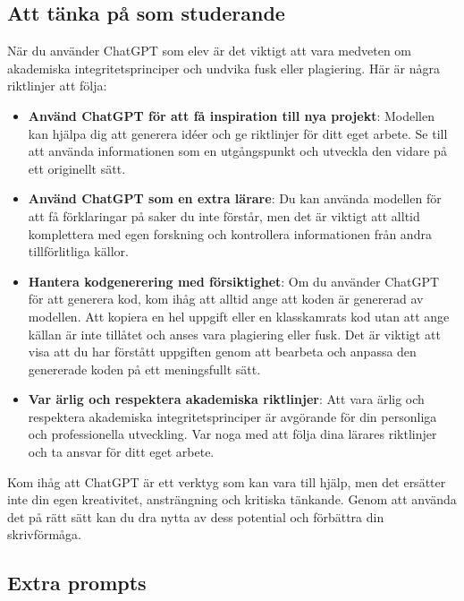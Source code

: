 \hypertarget{att-tuxe4nka-puxe5-som-studerande}{%
\subsection{Att tänka på som
studerande}\label{att-tuxe4nka-puxe5-som-studerande}}

När du använder ChatGPT som elev är det viktigt att vara medveten om
akademiska integritetsprinciper och undvika fusk eller plagiering. Här
är några riktlinjer att följa:

\begin{itemize}
\item
  \textbf{Använd ChatGPT för att få inspiration till nya projekt}:
  Modellen kan hjälpa dig att generera idéer och ge riktlinjer för ditt
  eget arbete. Se till att använda informationen som en utgångspunkt och
  utveckla den vidare på ett originellt sätt.
\item
  \textbf{Använd ChatGPT som en extra lärare}: Du kan använda modellen
  för att få förklaringar på saker du inte förstår, men det är viktigt
  att alltid komplettera med egen forskning och kontrollera
  informationen från andra tillförlitliga källor.
\item
  \textbf{Hantera kodgenerering med försiktighet}: Om du använder
  ChatGPT för att generera kod, kom ihåg att alltid ange att koden är
  genererad av modellen. Att kopiera en hel uppgift eller en
  klasskamrats kod utan att ange källan är inte tillåtet och anses vara
  plagiering eller fusk. Det är viktigt att visa att du har förstått
  uppgiften genom att bearbeta och anpassa den genererade koden på ett
  meningsfullt sätt.
\item
  \textbf{Var ärlig och respektera akademiska riktlinjer}: Att vara
  ärlig och respektera akademiska integritetsprinciper är avgörande för
  din personliga och professionella utveckling. Var noga med att följa
  dina lärares riktlinjer och ta ansvar för ditt eget arbete.
\end{itemize}

Kom ihåg att ChatGPT är ett verktyg som kan vara till hjälp, men det
ersätter inte din egen kreativitet, ansträngning och kritiska tänkande.
Genom att använda det på rätt sätt kan du dra nytta av dess potential
och förbättra din skrivförmåga.

\hypertarget{extra-prompts}{%
\subsection{Extra prompts}\label{extra-prompts}}

